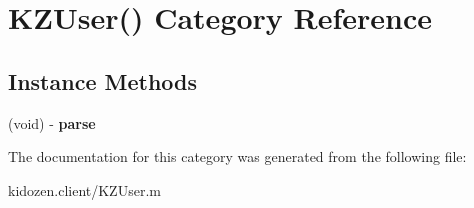 \hypertarget{category_k_z_user_07_08}{\section{K\-Z\-User() Category Reference}
\label{category_k_z_user_07_08}
}
\subsection*{Instance Methods}
\begin{DoxyCompactItemize}
\item 
\hypertarget{category_k_z_user_07_08_a65bef865ceac91c7a96207320bc33f0a}{(void) -\/ {\bfseries parse}}\label{category_k_z_user_07_08_a65bef865ceac91c7a96207320bc33f0a}

\end{DoxyCompactItemize}


The documentation for this category was generated from the following file\-:\begin{DoxyCompactItemize}
\item 
kidozen.\-client/K\-Z\-User.\-m\end{DoxyCompactItemize}

